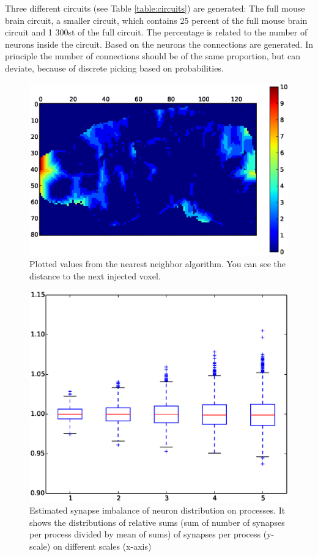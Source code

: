 \label{table:circuits}

Three different circuits (see Table \ref{table:circuits}) are generated: The full mouse brain circuit,
a smaller circuit, which contains 25 percent of the full mouse brain circuit and
1 300st of the full circuit. The percentage is related to the number of neurons inside
the circuit. Based on the neurons the connections are generated. In principle the
number of connections should be of the same proportion, but can deviate, because of 
discrete picking based on probabilities.


\begin{figure}[ht!]
\centering
\includegraphics[scale=0.5]{pictures/distance_x_y_70.eps}
\caption{Plotted values from the nearest neighbor algorithm. You can see the distance to the next injected voxel.}
\label{interpolationdistance}
\end{figure}

\begin{figure}[ht!]
\centering
\includegraphics[scale=0.4]{pictures/full_circuit_rack_distribution.eps}
\caption{Estimated synapse imbalance of neuron distribution on processes.
It shows the distributions of relative sums (sum of number of synapses per process divided by mean of sums) of synapses per process (y-scale) on different scales (x-axis) }
\label{fullcircuitdist}
\end{figure}

